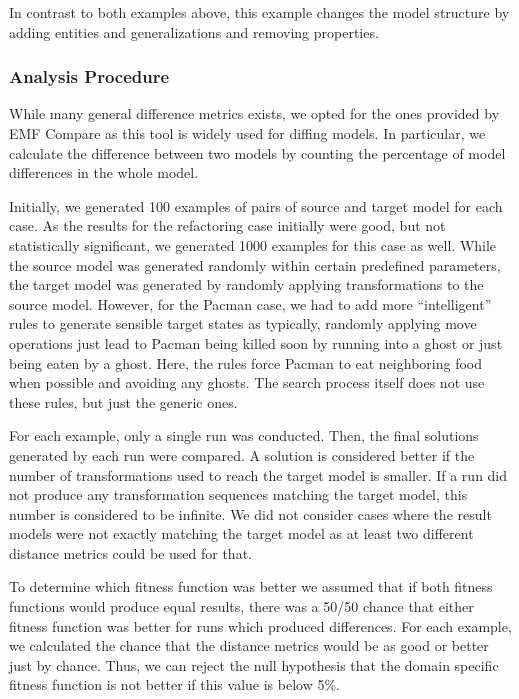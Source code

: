 In contrast to both examples above, this example changes the model structure by adding entities and generalizations and removing properties.

\subsubsection{Analysis Procedure}

While many general difference metrics exists, we opted for the ones provided by EMF Compare as this tool is widely used for diffing models. In particular, we calculate the difference between two models by counting the percentage of model differences in the whole model.

Initially, we generated 100 examples of pairs of source and target model for each case. As the results for the refactoring case initially were good, but not statistically significant, we generated 1000 examples for this case as well. While the source model was generated randomly within
certain predefined parameters, the target model was generated by randomly applying transformations to the source model. However, for the Pacman case, we had to add more ``intelligent'' rules to generate sensible target states as typically, randomly applying move operations just lead to Pacman being killed soon by running into a ghost or just being eaten by a ghost. Here, the rules force Pacman to eat neighboring food when possible and avoiding any ghosts. The search process itself does not use these rules, but just the generic ones.

For each example, only a single run was conducted. Then, the final solutions generated by each run were compared. A solution is considered better if the number of transformations used to reach the target model is smaller. If a run did not produce any transformation sequences matching the target model, this number is considered to be infinite. We did not consider cases where the result models were not exactly matching the target model as at least two different distance metrics could be used for that.

To determine which fitness function was better we assumed that if both fitness functions would produce equal results, there was a 50/50 chance that either fitness function was better for runs which produced differences.
For each example, we calculated the chance that the distance metrics would be as good or better just by chance.
Thus, we can reject the null hypothesis that the domain specific fitness function is not better if this value is below 5\%.

